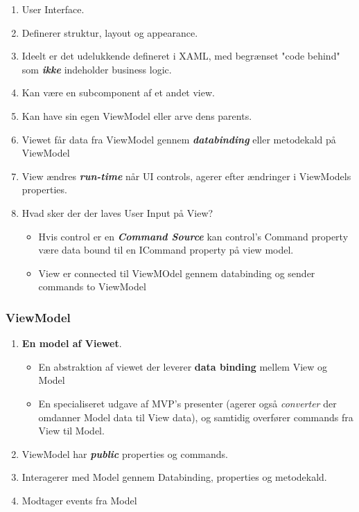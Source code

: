 \begin{enumerate}
	\item User Interface.
	\item Definerer struktur, layout og appearance.
	\item Ideelt er det udelukkende defineret i XAML, med begrænset "code behind" som \textbf{\textit{ikke}} indeholder business logic.
	\item Kan være en subcomponent af et andet view.
	\item Kan have sin egen ViewModel eller arve dens parents.
	\item Viewet får data fra ViewModel gennem \textbf{\textit{databinding}} eller metodekald på ViewModel
	\item View ændres \textbf{\textit{run-time}} når UI controls, agerer efter ændringer i ViewModels properties.
	\item Hvad sker der der laves User Input på View?
	\begin{itemize}
		\item Hvis control er en \textbf{\textit{Command Source}} kan control's Command property være data bound til en ICommand property på view model.
		\item View er connected til ViewMOdel gennem databinding og sender commands to ViewModel
	\end{itemize}
\end{enumerate}

\subsubsection{ViewModel}
\begin{enumerate}
	\item \textbf{En model af Viewet}.
	\begin{itemize}
		\item En abstraktion af viewet der leverer \textbf{data binding} mellem View og Model
		\item En specialiseret udgave af MVP's presenter (agerer også \textit{converter} der omdanner Model data til View data), og samtidig overfører commands fra View til Model.
	\end{itemize}
	\item ViewModel har \textbf{\textit{public}} properties og commands.
	\item  Interagerer med Model gennem Databinding, properties og metodekald.
	\item Modtager events fra Model
\end{enumerate}

